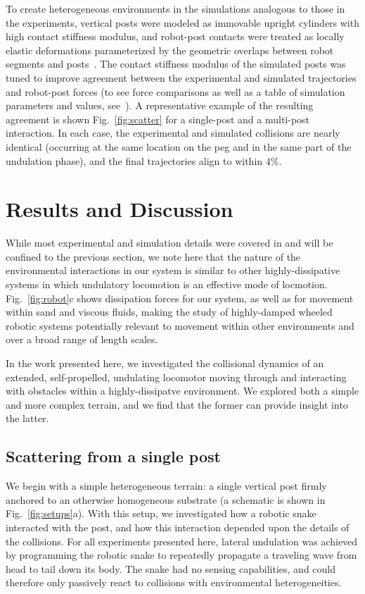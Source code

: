 \documentclass[aps,pre,twocolumn,superscriptaddress]{revtex4-1}
\begin{document}
To create heterogeneous environments in the simulations analogous to those in the experiments, vertical posts were modeled as immovable upright cylinders with high contact stiffness modulus, and robot-post contacts were treated as locally elastic deformations parameterized by the geometric overlaps between robot segments and posts~\cite{johnson1987contact}. The contact stiffness modulus of the simulated posts was tuned to improve agreement between the experimental and simulated trajectories and robot-post forces (to see force comparisons as well as a table of simulation parameters and values, see~\cite{supplemental}). A representative example of the resulting agreement is shown Fig.~\ref{fig:scatter} for a single-post and a multi-post interaction. In each case, the experimental and simulated collisions are nearly identical (occurring at the same location on the peg and in the same part of the undulation phase), and the final trajectories align to within $4\%$. 



\section{Results and Discussion}

While most experimental and simulation details were covered in and will be confined to the previous section, we note here that the nature of the environmental interactions in our system is similar to other highly-dissipative systems in which undulatory locomotion is an effective mode of locmotion. Fig.~\ref{fig:robot}c shows dissipation forces for our system, as well as for movement within sand and viscous fluids, making the study of highly-damped wheeled robotic systems potentially relevant to movement within other environments and over a broad range of length scales.

In the work presented here, we investigated the collisional dynamics of an extended, self-propelled, undulating locomotor moving through and interacting with obstacles within a highly-dissipatve environment. We explored both a simple and more complex terrain, and we find that the former can provide insight into the latter.


\subsection{Scattering from a single post}\label{sec:interaction}

We begin with a simple heterogeneous terrain: a single vertical post firmly anchored to an otherwise homogeneous substrate (a schematic is shown in Fig.~\ref{fig:setups}a). With this setup, we investigated how a robotic snake interacted with the post, and how this interaction depended upon the details of the collisions. For all experiments presented here, lateral undulation was achieved by programming the robotic snake to repeatedly propagate a traveling wave from head to tail down its body. The snake had no sensing capabilities, and could therefore only passively react to collisions with environmental heterogeneities. 
\end{document}
